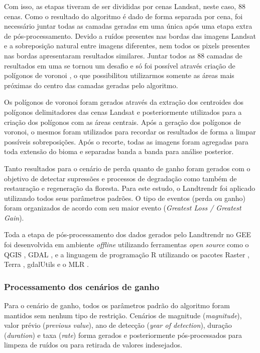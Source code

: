 \documentclass[12pt,a4paper]{article}
\begin{document}
Com isso, as etapas tiveram de ser divididas por cenas Landsat, neste caso, 88 cenas. Como o resultado do algoritmo é dado de forma separada por cena, foi necessário juntar todas as camadas geradas em uma única após uma etapa extra de pós-processamento. Devido a ruídos presentes nas bordas das imagens Landsat e a sobreposição natural entre imagens diferentes, nem todos os pixels presentes nas bordas apresentaram resultados similares. Juntar todos as 88 camadas de resultados em uma se tornou um desafio e só foi possível através criação de polígonos de voronoi \citep{Okabe}, o que possibilitou utilizarmos somente as áreas mais próximas do centro das camadas geradas pelo algoritmo. 

Os polígonos de voronoi foram gerados através da extração dos centroides dos polígonos delimitadores das cenas Landsat e posteriormente utilizados para a criação dos polígonos com as áreas centrais. Após a geração dos polígonos de voronoi, o mesmos foram utilizados para recordar os resultados de forma a limpar possíveis sobreposições. Após o recorte, todas as imagens foram agregadas para toda extensão do bioma e separadas banda a banda para análise posterior.


Tanto resultados para o cenário de perda quanto de ganho foram gerados com o objetivo de detectar supressões e processos de degradação como também de restauração e regeneração da floresta. Para este estudo, o Landtrendr foi aplicado utilizando todos seus parâmetros padrões. O tipo de eventos (perda ou ganho) foram organizados de acordo com seu maior evento (\textit{Greatest Loss / Greatest Gain}).

Toda a etapa de pós-processamento dos dados gerados pelo Landtrendr no GEE foi desenvolvida em ambiente \textit{offline} utilizando ferramentas \textit{open source} como o QGIS \citep{QGIS_software}, GDAL \citep{gdal}, e a linguagem de programação R \citep{Rsoftware} utilizando os pacotes Raster \citep{raster}, Terra \cite{terra}, gdalUtils \citep{gdalutils} e o MLR \citep{mlr}.

\subsubsection{Processamento dos cenários de ganho}
\hspace{13pt} Para o cenário de ganho, todos os parâmetros padrão do algoritmo foram mantidos sem nenhum tipo de restrição. Cenários de magnitude (\textit{magnitude}), valor prévio (\textit{previous value}), ano de detecção (\textit{year of detection}), duração (\textit{duration}) e taxa (\textit{rate}) forma gerados e posteriormente pós-processados para limpeza de ruídos ou para retirada de valores indesejados. 
\end{document}

